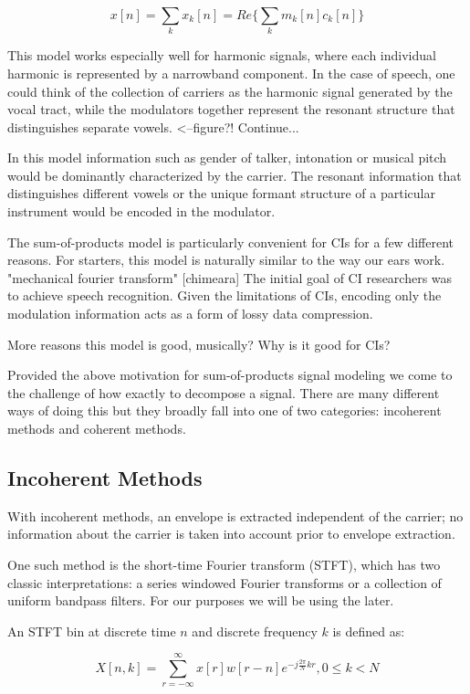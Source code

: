 \documentclass [11pt, proquest] {uwthesis}[2015/03/03]
\begin{document}
$$x[n] = \sum\limits_k x_k[n] = Re\bigg\{ \sum\limits_k m_k[n] c_k[n] \bigg\}$$

This model works especially well for harmonic signals, where each individual harmonic is represented by a narrowband component.  In the case of speech, one could think of the collection of carriers as the harmonic signal generated by the vocal tract, while the modulators together represent the resonant structure that distinguishes separate vowels. <--figure?!  Continue...

In this model information such as gender of talker, intonation or musical pitch would be dominantly characterized by the carrier.  The resonant information that distinguishes different vowels or the unique formant structure of a particular instrument would be encoded in the modulator.

The sum-of-products model is particularly convenient for CIs for a few different reasons. For starters, this model is naturally similar to the way our ears work. "mechanical fourier transform" [chimeara] The initial goal of CI researchers was to achieve speech recognition.  Given the limitations of CIs, encoding only the modulation information acts as a form of lossy data compression.

More reasons this model is good, musically?
Why is it good for CIs?

Provided the above motivation for sum-of-products signal modeling we come to the challenge of how exactly to decompose a signal.  There are many different ways of doing this but they broadly fall into one of two categories: incoherent methods and coherent methods.

\subsection{Incoherent Methods}

With incoherent methods, an envelope is extracted independent of the carrier; no information about the carrier is taken into account prior to envelope extraction.

One such method is the short-time Fourier transform (STFT), which has two classic interpretations: a series windowed Fourier transforms or a collection of uniform bandpass filters.  For our purposes we will be using the later.

An STFT bin at discrete time $n$ and discrete frequency $k$ is defined as:

$$X[n,k] = \sum\limits_{r=-\infty}^{\infty} x[r] w[r - n] e^{-j\frac{2\pi}{N}kr}, 0 \leq k < N$$
\end{document}
